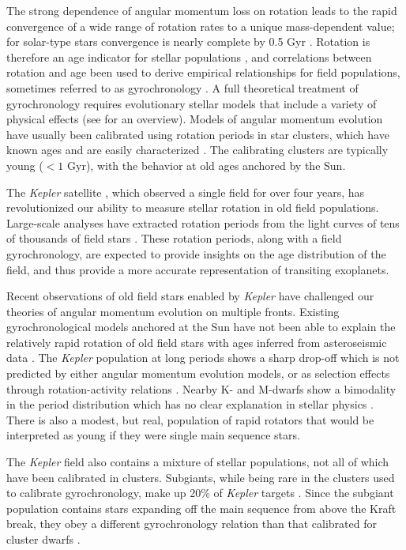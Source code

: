 \documentclass[twocolumn]{aastex6}
\newcommand{\Kepler}{\mbox{\textit{Kepler}}}
\begin{document}
The strong dependence of angular momentum loss on rotation \citep{Kawaler88}
leads to the rapid convergence of a wide range of rotation rates to a unique
mass-dependent value; for solar-type stars convergence is nearly complete by
0.5 Gyr \citep{Pinsonneault89}. Rotation is therefore an age indicator for 
stellar populations \citep{Skumanich72}, and correlations between rotation and
age been used to derive empirical relationships for field populations, 
sometimes referred to as gyrochronology \citep{Barnes07, Mamajek08, Meibom09,
Angus15}.  
A full theoretical treatment of gyrochronology requires evolutionary stellar 
models that include a variety of physical effects (see \citet{Gallet13} for an
overview). Models of angular momentum evolution have usually been calibrated 
using rotation periods in star clusters, which have known ages and are easily 
characterized \citep{Krishnamurthi97, Gallet13, Somers17}. The calibrating 
clusters are typically young (\(< 1\) Gyr), with the behavior at old ages anchored by the Sun. 

The \Kepler{} satellite \citep{Borucki10,Koch10}, which observed a single field
for over four years, has revolutionized our ability to measure stellar 
rotation in old field populations. Large-scale analyses have extracted 
rotation periods from the light curves of tens of thousands of field stars
\citep{Nielsen13, Reinhold13, Garcia14, McQuillan14}. These rotation periods, 
along with a field gyrochronology, are expected to provide insights on the age 
distribution of the field, and thus provide a more accurate representation of 
transiting exoplanets.

Recent observations of old field stars enabled by \Kepler{} have challenged 
our theories of angular momentum evolution on multiple fronts. Existing 
gyrochronological models anchored at the Sun have not been able to explain
the relatively rapid rotation of old field stars with ages inferred from
asteroseismic data \citep{Angus15, VanSaders16}. The \Kepler{} population at 
long periods shows a sharp drop-off which is not predicted by either angular
momentum evolution models, or as selection effects through rotation-activity 
relations \citep{VanSaders18}.  Nearby K- and M-dwarfs show a bimodality in 
the period distribution which has no clear explanation in stellar physics 
\citep{Davenport18}. There is also a modest, but real, population of rapid 
rotators that would be interpreted as young if they were single main sequence 
stars.

The \Kepler{} field also contains a mixture of stellar populations, not all of 
which have been calibrated in clusters. Subgiants, while being rare in the 
clusters used to calibrate gyrochronology, 
make up 20\% of \Kepler{} targets \citep{Berger18b}. Since the 
subgiant population contains stars expanding off the main sequence from 
above the Kraft break, they obey a different gyrochronology relation than that 
calibrated for cluster dwarfs \citep{vanSaders13}. 
\end{document}
